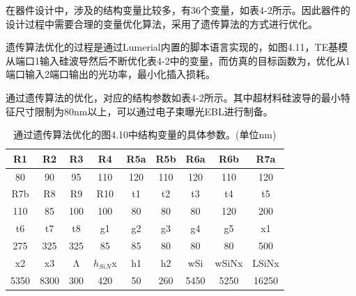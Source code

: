 在器件设计中，涉及的结构变量比较多，有36个变量，如表4-2所示。因此器件的设计过程中需要合理的变量优化算法，采用了遗传算法的方式进行优化。

遗传算法优化的过程是通过Lumerial内置的脚本语言实现的，如图4.11，TE基模从端口1输入硅波导然后不断优化表4-2中的变量，而仿真的目标函数为，优化从1端口输入2端口输出的光功率，最小化插入损耗。

通过遗传算法的优化，对应的结构参数如表4-2所示。其中超材料硅波导的最小特征尺寸限制为80nm以上，可以通过电子束曝光EBL进行制备。


\begin{table}[!htbp]
    \caption{通过遗传算法优化的图4.10中结构变量的具体参数。(单位nm)}
    \label{tab:5}
    \centering
    \footnotesize%
    \setlength{\tabcolsep}{4pt}%
    \renewcommand{\arraystretch}{1.2}%
\begin{tabular}{ccccccccc}
R1   & R2   & R3  & R4    & R5a & R5b & R6a  & R6b   & R7a   \\ \hline
80   & 90   & 95  & 110   & 120 & 110 & 120  & 110   & 120   \\
R7b  & R8   & R9  & R10   & t1  & t2  & t3   & t4    & t5    \\ \hline
110  & 85   & 100 & 100   & 80  & 80  & 80   & 120   & 200   \\
t6   & t7   & t8  & g1    & g2  & g3  & g4   & g5    & x1    \\ \hline
275  & 325  & 325 & 85    & 85  & 80  & 80   & 80    & 500   \\
x2   & x3   & Λ   & $h_{SiN}$x & h1  & h2  & wSi  & wSiNx & LSiNx \\ \hline
5350 & 8300 & 300 & 420   & 50  & 260 & 5450 & 5250  & 16250
\end{tabular}
\end{table}

